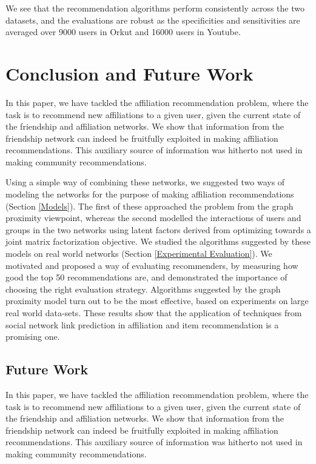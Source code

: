 \documentclass{sig-alternate}
\begin{document}
We see that the recommendation algorithms perform consistently across the two datasets, and the evaluations are robust as the specificities and sensitivities are averaged over 9000 users in Orkut and 16000 users in Youtube.

\section{Conclusion and Future Work}
\label{Conclusion and Future Work}
In this paper, we have tackled the affiliation recommendation problem, where the task is to recommend new affiliations to a given user, given the current state of the friendship and affiliation networks. We show that information from the friendship network can indeed be fruitfully exploited in making affiliation recommendations. This auxiliary source of information was hitherto not used in making community recommendations.

Using a simple way of combining these networks, we suggested two ways of modeling the networks for the purpose of making affiliation recommendations (Section \ref{Models}). The first of these approached the problem from the graph proximity viewpoint, whereas the second modelled the interactions of users and groups in the two networks using latent factors derived from optimizing towards a joint matrix factorization objective. We studied the algorithms suggested by these models on real world networks (Section \ref{Experimental Evaluation}). We motivated and proposed a way of evaluating recommenders, by measuring how good the top 50 recommendations are, and demonstrated the importance of choosing the right evaluation strategy. Algorithms suggested by the graph proximity model turn out to be the most effective, based on experiments on large real world data-sets. These results show that the application of techniques from social network link prediction in affiliation and item recommendation is a promising one.

\subsection{Future Work}
In this paper, we have tackled the affiliation recommendation problem, where the task is to recommend new affiliations to a given user, given the current state of the friendship and affiliation networks. We show that information from the friendship network can indeed be fruitfully exploited in making affiliation recommendations. This auxiliary source of information was hitherto not used in making community recommendations.
\end{document}
